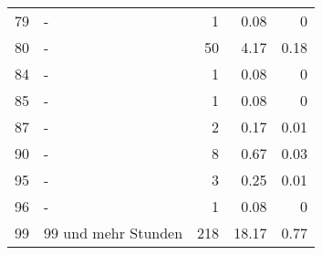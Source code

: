 \begin{longtable}{lXrrr}
        79 & \multicolumn{1}{X}{-} & %
          \num{1} &
          \num[round-mode=places,round-precision=2]{0.08} &
          \num[round-mode=places,round-precision=2]{0} \\

        80 & \multicolumn{1}{X}{-} & %
          \num{50} &
          \num[round-mode=places,round-precision=2]{4.17} &
          \num[round-mode=places,round-precision=2]{0.18} \\

        84 & \multicolumn{1}{X}{-} & %
          \num{1} &
          \num[round-mode=places,round-precision=2]{0.08} &
          \num[round-mode=places,round-precision=2]{0} \\

        85 & \multicolumn{1}{X}{-} & %
          \num{1} &
          \num[round-mode=places,round-precision=2]{0.08} &
          \num[round-mode=places,round-precision=2]{0} \\

        87 & \multicolumn{1}{X}{-} & %
          \num{2} &
          \num[round-mode=places,round-precision=2]{0.17} &
          \num[round-mode=places,round-precision=2]{0.01} \\

        90 & \multicolumn{1}{X}{-} & %
          \num{8} &
          \num[round-mode=places,round-precision=2]{0.67} &
          \num[round-mode=places,round-precision=2]{0.03} \\

        95 & \multicolumn{1}{X}{-} & %
          \num{3} &
          \num[round-mode=places,round-precision=2]{0.25} &
          \num[round-mode=places,round-precision=2]{0.01} \\

        96 & \multicolumn{1}{X}{-} & %
          \num{1} &
          \num[round-mode=places,round-precision=2]{0.08} &
          \num[round-mode=places,round-precision=2]{0} \\

        99 & \multicolumn{1}{X}{99 und mehr Stunden} & %
          \num{218} &
          \num[round-mode=places,round-precision=2]{18.17} &
          \num[round-mode=places,round-precision=2]{0.77} \\


\end{longtable}
